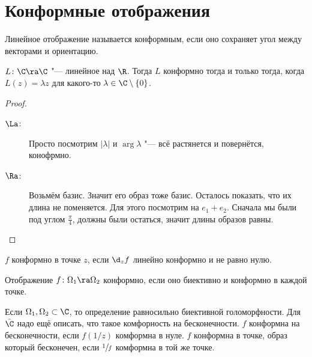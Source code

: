 \section{Конформные отображения}

\begin{Def}
	Линейное отображение называется конформным, если оно сохраняет угол между векторами и ориентацию.
\end{Def}

\begin{theorem}
	$L\colon \C \ra \C$ "--- линейное над $\R$.
	Тогда $L$ конформно тогда и только тогда, когда $L(z) = \lambda z$ для какого-то $\lambda \in \C \setminus \{0\}$.
\end{theorem}
\begin{proof}\begin{description}
\item[$\La$:] Просто посмотрим $|\lambda|$ и $\arg \lambda$ "--- всё растянется и повернётся, конофрмно.
\item[$\Ra$:] Возьмём базис. Значит его образ тоже базис. Осталось показать, что их длина не поменяется. Для этого посмотрим на $e_1 + e_2$.
	Сначала мы были под углом $\frac{\pi}4$, должны были остаться, значит длины образов равны.
\end{description}\end{proof}

\begin{Def}
	$f$ конформно в точке $z$, если $\d_z f$ линейно конформно и не равно нулю.
\end{Def}

\begin{Def}
	Отображение $f\colon \Omega_1 \ra \Omega_2$ конформно, если оно биективно и конформно в каждой точке.
\end{Def}
\begin{Rem}
	Если $\Omega_1, \Omega_2 \subset \C$, то определение равносильно биективной голоморфности.
	Для $\bar \C$ надо ещё описать, что такое комфорность на бесконечности.
	$f$ конформна на бесконечности, если $f(1/z)$ комформна в нуле.
	$f$ конформна в точке, образ который бесконечен, если $\sfrac1f$ комформна в той же точке.
\end{Rem}


